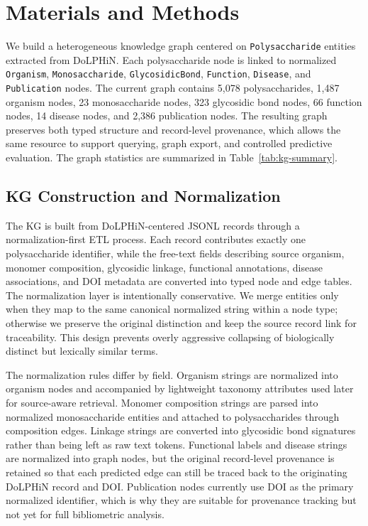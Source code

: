 \documentclass[11pt]{article}
\begin{document}
\section{Materials and Methods}
\label{sec:methods}

We build a heterogeneous knowledge graph centered on \texttt{Polysaccharide} entities extracted from DoLPHiN. Each polysaccharide node is linked to normalized \texttt{Organism}, \texttt{Monosaccharide}, \texttt{GlycosidicBond}, \texttt{Function}, \texttt{Disease}, and \texttt{Publication} nodes. The current graph contains 5,078 polysaccharides, 1,487 organism nodes, 23 monosaccharide nodes, 323 glycosidic bond nodes, 66 function nodes, 14 disease nodes, and 2,386 publication nodes. The resulting graph preserves both typed structure and record-level provenance, which allows the same resource to support querying, graph export, and controlled predictive evaluation. The graph statistics are summarized in Table~\ref{tab:kg-summary}.

\subsection{KG Construction and Normalization}
\label{sec:kg-construction}

The KG is built from DoLPHiN-centered JSONL records through a normalization-first ETL process. Each record contributes exactly one polysaccharide identifier, while the free-text fields describing source organism, monomer composition, glycosidic linkage, functional annotations, disease associations, and DOI metadata are converted into typed node and edge tables. The normalization layer is intentionally conservative. We merge entities only when they map to the same canonical normalized string within a node type; otherwise we preserve the original distinction and keep the source record link for traceability. This design prevents overly aggressive collapsing of biologically distinct but lexically similar terms.

The normalization rules differ by field. Organism strings are normalized into organism nodes and accompanied by lightweight taxonomy attributes used later for source-aware retrieval. Monomer composition strings are parsed into normalized monosaccharide entities and attached to polysaccharides through composition edges. Linkage strings are converted into glycosidic bond signatures rather than being left as raw text tokens. Functional labels and disease strings are normalized into graph nodes, but the original record-level provenance is retained so that each predicted edge can still be traced back to the originating DoLPHiN record and DOI. Publication nodes currently use DOI as the primary normalized identifier, which is why they are suitable for provenance tracking but not yet for full bibliometric analysis.
\end{document}
